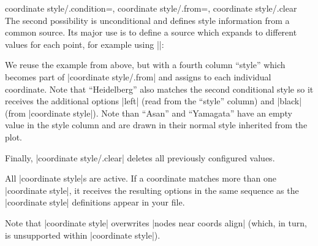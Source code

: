 {\begin{pgfplotskeylist}{%
    coordinate style/.condition=,
    coordinate style/.from=,
    coordinate style/.clear%
}
    The second possibility  is
    unconditional and defines style information from a common source. Its major
    use is to define a source which expands to different values for each point,
    for example using |\thisrow|:
\begin{codeexample}[]
\end{codeexample}
    We reuse the example from above, but with a fourth column ``style'' which
    becomes part of |coordinate style/.from| and assigns  to each
    individual coordinate. Note that ``Heidelberg'' also matches the second
    conditional style so it receives the additional options |left| (read from
    the ``style'' column) and |black| (from |coordinate style|). Note than
    ``Asan'' and ``Yamagata'' have an empty value in the style column and are
    drawn in their normal style inherited from the plot.

    Finally, |coordinate style/.clear| deletes all previously configured
    values.

    All |coordinate style|s are active. If a coordinate matches more than one
    |coordinate style|, it receives the resulting options in the same sequence
    as the |coordinate style| definitions appear in your file.

    Note that |coordinate style| overwrites |nodes near coords align| (which,
    in turn, is unsupported within |coordinate style|).


\end{pgfplotskeylist}}
